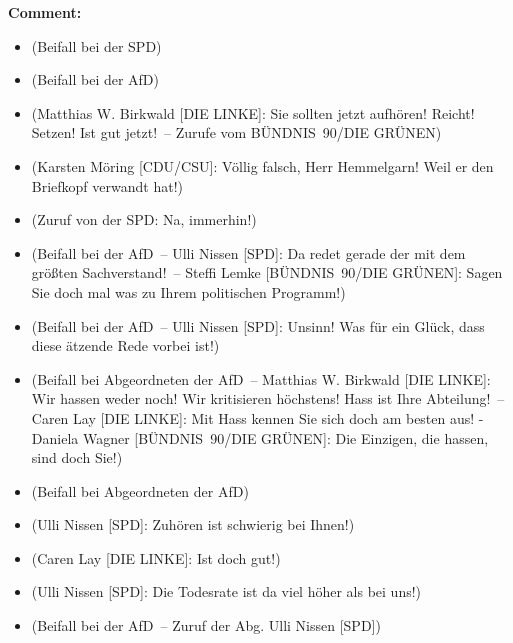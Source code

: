 \documentclass{article}
\begin{document}
\noindent\textbf{Comment:}
\begin{itemize}
    \setlength\itemsep{-3pt}
    \item (Beifall bei der SPD)
    \setlength\itemsep{-3pt}
    \item (Beifall bei der AfD)
    \setlength\itemsep{-3pt}
    \item (Matthias W. Birkwald [DIE LINKE]: Sie sollten jetzt aufhören! Reicht! Setzen! Ist gut jetzt! – Zurufe vom BÜNDNIS 90/DIE GRÜNEN)
    \setlength\itemsep{-3pt}
    \item (Karsten Möring [CDU/CSU]: Völlig falsch, Herr Hemmelgarn! Weil er den Briefkopf verwandt hat!)
    \setlength\itemsep{-3pt}
    \item (Zuruf von der SPD: Na, immerhin!)
    \setlength\itemsep{-3pt}
    \item (Beifall bei der AfD – Ulli Nissen [SPD]: Da redet gerade der mit dem größten Sachverstand! – Steffi Lemke [BÜNDNIS 90/DIE GRÜNEN]: Sagen Sie doch mal was zu Ihrem politischen Programm!)
    \setlength\itemsep{-3pt}
    \item (Beifall bei der AfD – Ulli Nissen [SPD]: Unsinn! Was für ein Glück, dass diese ätzende Rede vorbei ist!)
    \setlength\itemsep{-3pt}
    \item (Beifall bei Abgeordneten der AfD – Matthias W. Birkwald [DIE LINKE]: Wir hassen weder noch! Wir kritisieren höchstens! Hass ist Ihre Abteilung! – Caren Lay [DIE LINKE]: Mit Hass kennen Sie sich doch am besten aus! -Daniela Wagner [BÜNDNIS 90/DIE GRÜNEN]: Die Einzigen, die hassen, sind doch Sie!)
    \setlength\itemsep{-3pt}
    \item (Beifall bei Abgeordneten der AfD)
    \setlength\itemsep{-3pt}
    \item (Ulli Nissen [SPD]: Zuhören ist schwierig bei Ihnen!)
    \setlength\itemsep{-3pt}
    \item (Caren Lay [DIE LINKE]: Ist doch gut!)
    \setlength\itemsep{-3pt}
    \item (Ulli Nissen [SPD]: Die Todesrate ist da viel höher als bei uns!)
    \setlength\itemsep{-3pt}
    \item (Beifall bei der AfD – Zuruf der Abg. Ulli Nissen [SPD])
\end{itemize}
\end{document}
